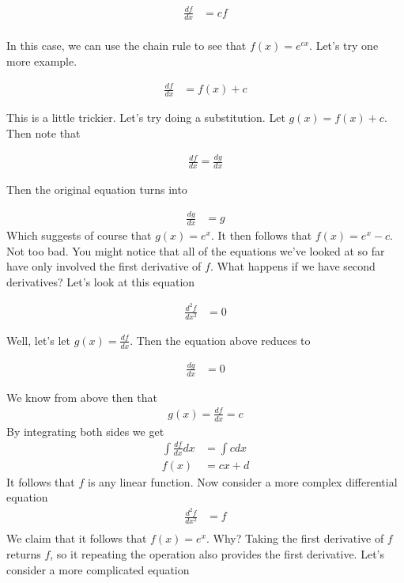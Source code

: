 \documentclass[book.tex]{subfiles}
\begin{document}
\begin{align}
    \frac{df}{dx} &= c f \\
\end{align}

In this case, we can use the chain rule to see that $f(x) = e^{cx}$. Let's try one more example.

\begin{align}
    \frac{df}{dx} &= f(x) + c
\end{align}

This is a little trickier. Let's try doing a substitution. Let $g(x) = f(x) + c$. Then note that 

\begin{align}
    \frac{df}{dx} = \frac{dg}{dx}
\end{align} 

Then the original equation turns into

\begin{align}
    \frac{dg}{dx} &= g 
\end{align}
Which suggests of course that $g(x) = e^x$. It then follows that $f(x) = e^{x} - c$. Not too bad. You might notice that all of the equations we've looked at so far have only involved the first derivative of $f$. What happens if we have second derivatives? Let's look at this equation

\begin{align}
    \frac{d^2 f}{dx^2} &= 0
\end{align}

Well, let's let $g(x) = \frac{df}{dx}$. Then the equation above reduces to

\begin{align}
    \frac{dg}{dx} & = 0
\end{align}

We know from above then that 
\begin{align}
    g(x) = \frac{df}{dx} =  c
\end{align}
By integrating both sides we get
\begin{align}
    \int \frac{df}{dx} dx &= \int c dx \\
    f(x) &= cx + d
\end{align}
It follows that $f$ is any linear function. Now consider a more complex differential equation
\begin{align}
    \frac{d^2 f}{dx^2} & = f \\\
\end{align}
We claim that it follows that $f(x) = e^x$. Why? Taking the first derivative of $f$ returns $f$, so it repeating the operation also provides the first derivative. Let's consider a more complicated equation
\end{document}
